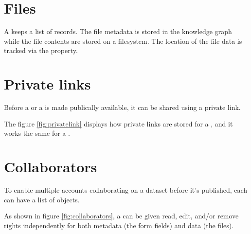 
\section{Files}

  A  keeps a list of  records.  The file
  metadata is stored in the knowledge graph while the file contents are
  stored on a filesystem.  The location of the file data is tracked via the
   property.


\section{Private links}

  Before a  or a  is made publically
  available, it can be shared using a private link.


  The figure \ref{fig:privatelink} displays how private links are stored for
  a , and it works the same for a .

\section{Collaborators}

  To enable multiple accounts collaborating on a dataset before it's published,
  each  can have a list of  objects.


  As shown in figure \ref{fig:collaborators}, a  can be
  given read, edit, and/or remove rights independently for both metadata (the
  form fields) and data (the files).
